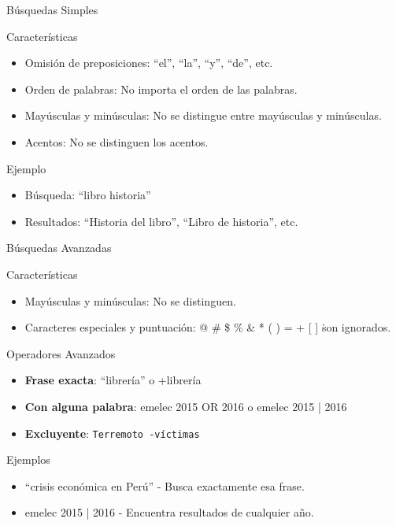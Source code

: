 \documentclass[
11pt, %
]{beamer}
\begin{document}
\begin{frame}{Búsquedas Simples}
	\begin{block}{Características}
		\begin{itemize}
			\item \alert{Omisión de preposiciones}: ``el'', ``la'', ``y'', ``de'', etc.
			\item \alert{Orden de palabras}: No importa el orden de las palabras.
			\item \alert{Mayúsculas y minúsculas}: No se distingue entre mayúsculas y minúsculas.
			\item \alert{Acentos}: No se distinguen los acentos.
		\end{itemize}
	\end{block}
	\begin{exampleblock}{Ejemplo}
		\begin{itemize}
			\item Búsqueda: ``libro historia''
			\item Resultados: ``Historia del libro'', ``Libro de historia'', etc.
		\end{itemize}
	\end{exampleblock}
\end{frame}

\begin{frame}{Búsquedas Avanzadas}
	\begin{block}{Características}
		\begin{itemize}
			\item \alert{Mayúsculas y minúsculas}: No se distinguen.
			\item \alert{Caracteres especiales y puntuación}: @ \# \$ \% \& * ( ) = + [ ] \. son ignorados.
		\end{itemize}
	\end{block}

	\begin{alertblock}{Operadores Avanzados}
		\begin{itemize}
			\item \textbf{Frase exacta}: ``librería'' o +librería
			\item \textbf{Con alguna palabra}: emelec 2015 OR 2016 o emelec 2015 | 2016
			\item \textbf{Excluyente}: \texttt{Terremoto -víctimas}
		\end{itemize}
	\end{alertblock}

	\begin{exampleblock}{Ejemplos}
		\begin{itemize}
			\item ``crisis económica en Perú'' - Busca exactamente esa frase.
			\item emelec 2015 | 2016 - Encuentra resultados de cualquier año.
		\end{itemize}
	\end{exampleblock}
\end{frame}
\end{document}
